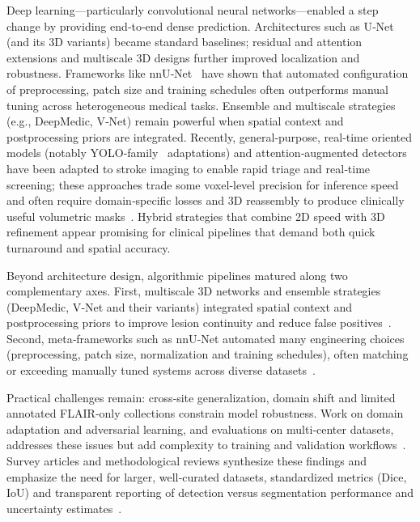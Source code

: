 \documentclass[12pt]{article}
\begin{document}
Deep learning—particularly convolutional neural networks—enabled a step change by providing end‑to‑end dense prediction. Architectures such as U‑Net~\cite{ronnebergerUNetConvolutionalNetworks2015} (and its 3D variants) became standard baselines; residual and attention extensions and multiscale 3D designs further improved localization and robustness. Frameworks like nnU‑Net~\cite{isenseeAbstractNnUNetSelfadapting2019} have shown that automated configuration of preprocessing, patch size and training schedules often outperforms manual tuning across heterogeneous medical tasks. Ensemble and multiscale strategies~\cite{Litjens2017,Menze2015} (e.g., DeepMedic, V‑Net) remain powerful when spatial context and postprocessing priors are integrated. Recently, general‑purpose, real‑time oriented models (notably YOLO‑family~\cite{chenMSAYOLOv5MultiscaleAttentionbased2023} adaptations) and attention‑augmented detectors have been adapted to stroke imaging to enable rapid triage and real‑time screening; these approaches trade some voxel‑level precision for inference speed and often require domain‑specific losses and 3D reassembly to produce clinically useful volumetric masks~\cite{chenAutomaticDetectionStroke2022,chenMSAYOLOv5MultiscaleAttentionbased2023,gheibiCNNResDeepLearning2023}. Hybrid strategies that combine 2D speed with 3D refinement appear promising for clinical pipelines that demand both quick turnaround and spatial accuracy. 

Beyond architecture design, algorithmic pipelines matured along two complementary axes. First, multiscale 3D networks and ensemble strategies (DeepMedic, V‑Net and their variants) integrated spatial context and postprocessing priors to improve lesion continuity and reduce false positives~\cite{kamnitsasEfficientMultiscale3D2017,Milletari2016,liFullyConvolutionalNetwork2018}. Second, meta‑frameworks such as nnU‑Net automated many engineering choices (preprocessing, patch size, normalization and training schedules), often matching or exceeding manually tuned systems across diverse datasets~\cite{Isensee2021,isenseeAbstractNnUNetSelfadapting2019}.

Practical challenges remain: cross‑site generalization, domain shift and limited annotated FLAIR‑only collections constrain model robustness. Work on domain adaptation and adversarial learning, and evaluations on multi‑center datasets, addresses these issues but add complexity to training and validation workflows~\cite{Kamnitsas2017DA,Karani2018}. Survey articles and methodological reviews synthesize these findings and emphasize the need for larger, well‑curated datasets, standardized metrics (Dice, IoU) and transparent reporting of detection versus segmentation performance and uncertainty estimates~\cite{Litjens2017,minaeeImageSegmentationUsing2021,liuReviewDeepLearningBasedMedical2021,TahaHanbury2015}.
\end{document}
